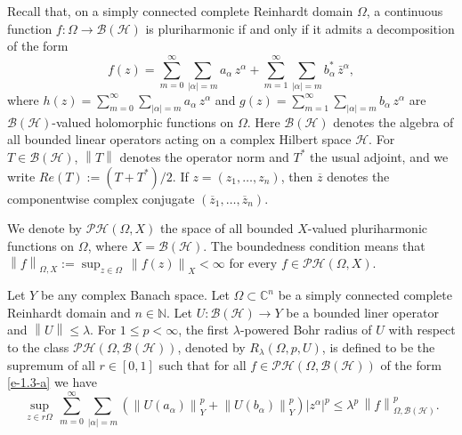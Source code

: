 \documentclass[a4paper,11pt, reqno]{amsart}
\theoremstyle{definition}
\newcommand{\norm}[1]{\left\lVert#1\right\rVert}
\begin{document}
	 Recall that, on a simply connected complete Reinhardt domain $\Omega$, a continuous function $f:\Omega \rightarrow \mathcal{B}(\mathcal{H})$ is pluriharmonic if and only if it admits a decomposition of the form
	 \begin{equation} \label{e-1.3-a}
	 	f(z)=\sum_{m=0}^{\infty} \sum_{|\alpha|=m} a_{\alpha}\, z^{\alpha} + \sum_{m=1}^{\infty} \sum_{|\alpha|=m} b^{*}_{\alpha}\, \bar{z}^{\alpha},
	 \end{equation}
	 where $h(z)=\sum_{m=0}^{\infty} \sum_{|\alpha|=m} a_{\alpha}\, z^{\alpha}$ and $g(z)=\sum_{m=1}^{\infty} \sum_{|\alpha|=m} b_{\alpha}\, z^{\alpha}$ are $\mathcal{B}(\mathcal{H})$-valued holomorphic functions on $\Omega$. Here $\mathcal{B}(\mathcal{H})$ denotes the algebra of all bounded linear operators acting on a complex Hilbert space $\mathcal{H}$. For $T \in \mathcal{B}(\mathcal{H})$, $\norm{T}$ denotes the operator norm and $T^{*}$ the usual adjoint, and we write $Re(T):=(T+T^*)/2$. If $z=(z_1,\ldots,z_n)$, then $\overline{z}$ denotes the componentwise complex conjugate $(\overline{z}_1,\ldots,\overline{z}_n)$.
	 
	 We denote by $\mathcal{PH}(\Omega,X)$ the space of all bounded $X$-valued pluriharmonic functions on $\Omega$, where $X=\mathcal{B}(\mathcal{H})$. The boundedness condition means that $\norm{f}_{\Omega,X}:=\sup_{z \in \Omega}\,\norm{f(z)}_{X} < \infty$ for every $f \in \mathcal{PH}(\Omega,X)$.
	\par
	Let $Y$ be any complex Banach space. Let $\Omega\subset \mathbb{C}^n$ be a simply connected complete Reinhardt domain and $n\in \mathbb{N}$. Let $U:\mathcal{B}(\mathcal{H})\rightarrow Y$ be a bounded liner operator and $\norm{U} \leq \lambda$. For $1 \leq p < \infty$, the first $\lambda$-powered Bohr radius of $U$ with respect to the class $\mathcal{PH}(\Omega,\mathcal{B}(\mathcal{H}))$, denoted by $R_{\lambda}(\Omega, p,U)$, is defined to be the supremum of all $r \in [0,1]$ such that for all $f \in \mathcal{PH}(\Omega,\mathcal{B}(\mathcal{H}))$ of the form \eqref{e-1.3-a} we have 
	\begin{equation} \label{e-1.4-a}
		\sup_{z \in r\Omega}\,\sum_{m=0}^{\infty} \sum_{|\alpha|=m} (\norm{U(a_{\alpha})}^p_{Y} + \norm{U(b_{\alpha})}^p_{Y})|z^\alpha|^p \leq \lambda^p\,\norm{f}^p_{\Omega,\mathcal{B}(\mathcal{H})}. 
	\end{equation}
	
\end{document}
